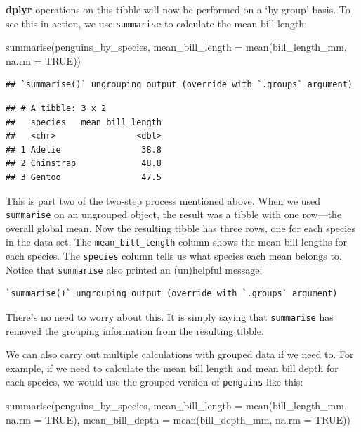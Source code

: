 \documentclass[
]{book}
\newenvironment{Shaded}{\begin{snugshade}}{\end{snugshade}}
\newcommand{\AttributeTok}[1]{\textcolor[rgb]{0.77,0.63,0.00}{#1}}
\newcommand{\ConstantTok}[1]{\textcolor[rgb]{0.00,0.00,0.00}{#1}}
\newcommand{\FunctionTok}[1]{\textcolor[rgb]{0.00,0.00,0.00}{#1}}
\newcommand{\NormalTok}[1]{#1}
\begin{document}
\textbf{dplyr} operations on this tibble will now be performed on a `by group' basis. To see this in action, we use \texttt{summarise} to calculate the mean bill length:

\begin{Shaded}
\begin{Highlighting}[]
\FunctionTok{summarise}\NormalTok{(penguins\_by\_species, }
          \AttributeTok{mean\_bill\_length =} \FunctionTok{mean}\NormalTok{(bill\_length\_mm, }\AttributeTok{na.rm =} \ConstantTok{TRUE}\NormalTok{))}
\end{Highlighting}
\end{Shaded}

\begin{verbatim}
## `summarise()` ungrouping output (override with `.groups` argument)
\end{verbatim}

\begin{verbatim}
## # A tibble: 3 x 2
##   species   mean_bill_length
##   <chr>                <dbl>
## 1 Adelie                38.8
## 2 Chinstrap             48.8
## 3 Gentoo                47.5
\end{verbatim}

This is part two of the two-step process mentioned above. When we used \texttt{summarise} on an ungrouped object, the result was a tibble with one row---the overall global mean. Now the resulting tibble has three rows, one for each species in the data set. The \texttt{mean\_bill\_length} column shows the mean bill lengths for each species. The \texttt{species} column tells us what species each mean belongs to. Notice that \texttt{summarise} also printed an (un)helpful message:

\begin{verbatim}
`summarise()` ungrouping output (override with `.groups` argument)
\end{verbatim}

There's no need to worry about this. It is simply saying that \texttt{summarise} has removed the grouping information from the resulting tibble.

We can also carry out multiple calculations with grouped data if we need to. For example, if we need to calculate the mean bill length and mean bill depth for each species, we would use the grouped version of \texttt{penguins} like this:

\begin{Shaded}
\begin{Highlighting}[]
\FunctionTok{summarise}\NormalTok{(penguins\_by\_species, }
          \AttributeTok{mean\_bill\_length =} \FunctionTok{mean}\NormalTok{(bill\_length\_mm, }\AttributeTok{na.rm =} \ConstantTok{TRUE}\NormalTok{),}
          \AttributeTok{mean\_bill\_depth  =} \FunctionTok{mean}\NormalTok{(bill\_depth\_mm,  }\AttributeTok{na.rm =} \ConstantTok{TRUE}\NormalTok{))}
\end{Highlighting}
\end{Shaded}
\end{document}
